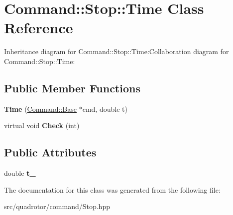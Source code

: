 \hypertarget{classCommand_1_1Stop_1_1Time}{
\section{Command::Stop::Time Class Reference}
\label{classCommand_1_1Stop_1_1Time}
}
Inheritance diagram for Command::Stop::Time:Collaboration diagram for Command::Stop::Time:\subsection*{Public Member Functions}
\begin{DoxyCompactItemize}
\item 
\hypertarget{classCommand_1_1Stop_1_1Time_a4568ced87aad2d8bb8abcbd0188458d1}{
{\bfseries Time} (\hyperlink{classCommand_1_1Base}{Command::Base} $\ast$cmd, double t)}
\label{classCommand_1_1Stop_1_1Time_a4568ced87aad2d8bb8abcbd0188458d1}

\item 
\hypertarget{classCommand_1_1Stop_1_1Time_ab90dbacde37291aa0f778019bb8c5f6f}{
virtual void {\bfseries Check} (int)}
\label{classCommand_1_1Stop_1_1Time_ab90dbacde37291aa0f778019bb8c5f6f}

\end{DoxyCompactItemize}
\subsection*{Public Attributes}
\begin{DoxyCompactItemize}
\item 
\hypertarget{classCommand_1_1Stop_1_1Time_aad1dfd6b50c86d229b591fd0315b3727}{
double {\bfseries t\_\-}}
\label{classCommand_1_1Stop_1_1Time_aad1dfd6b50c86d229b591fd0315b3727}

\end{DoxyCompactItemize}


The documentation for this class was generated from the following file:\begin{DoxyCompactItemize}
\item 
src/quadrotor/command/Stop.hpp\end{DoxyCompactItemize}
